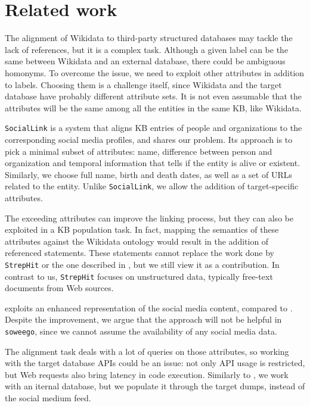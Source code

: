 \clearpage
\newpage

\chapter{Related work}
\label{cha:2}
The alignment of Wikidata to third-party structured databases may tackle the lack of references, but it is a complex task. Although a given label can be the same between Wikidata and an external database, there could be ambiguous homonyms. To overcome the issue, we need to exploit other attributes in addition to labels. Choosing them is a challenge itself, since Wikidata and the target database have probably different attribute sets. It is not even assumable that the attributes will be the same among all the entities in the same KB, like Wikidata. 

\texttt{SocialLink} is a system that aligns KB entries of people and organizations to the  corresponding social media profiles,\cite{DBLP:conf/semweb/NechaevCG17a} and shares our problem. Its approach is to pick a minimal subset of attributes: name, difference between person and organization and temporal information that tells if the entity is alive or existent. Similarly, we choose full name, birth and death dates, as well as a set of URLs related to the entity. Unlike \texttt{SocialLink}, we allow the addition of target-specific attributes.

The exceeding attributes can improve the linking process, but they can also be exploited in a KB population task. In fact, mapping the semantics of these attributes against the Wikidata ontology would result in the addition of referenced statements. These statements cannot replace the work done by \texttt{StrepHit}\cite{DBLP:journals/semweb/FossatiDG18} or the one described in \cite{self:SocialLink/TypePrediction}, but we still view it as a contribution. In contrast to us, \texttt{StrepHit} focuses on unstructured data, typically free-text documents from Web sources.

\cite{self:SocialLink/Embeddings} exploits an enhanced representation of the social media content, compared to \cite{DBLP:conf/sac/NechaevCG17}. Despite the improvement, we argue that the approach will not be helpful in \texttt{soweego}, since we cannot assume the availability of any social media data.

The alignment task deals with a lot of queries on those attributes, so working with the target database APIs could be an issue: not only API usage is restricted, but Web requests also bring latency in code execution. Similarly to \cite{DBLP:conf/sac/NechaevCG17}, we work with an iternal database, but we populate it through the target dumps, instead of the social medium feed.


